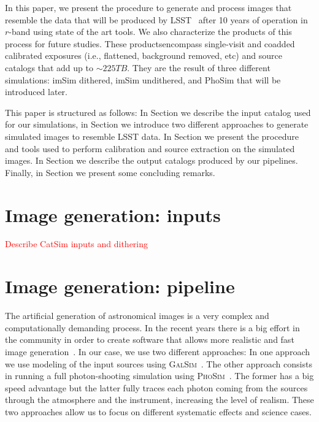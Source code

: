 \documentclass[\docopts]{\docclass}
\begin{document}
In this paper, we present the procedure to generate and process images that resemble the data that will be produced by
LSST~\citep{2008arXiv0805.2366I} after 10 years of operation in $r$-band using state of the art tools. We also characterize
the products of this process for future studies. These productsencompass single-visit and coadded calibrated exposures
(i.e., flattened, background removed, etc) and source catalogs that add up to $\sim 225 TB$. They are the result of three
different simulations: imSim dithered, imSim undithered, and PhoSim that will be introduced later.

This paper is structured as follows: In Section  we describe the input catalog used for our simulations,
in Section  we introduce two different approaches to generate simulated images to
resemble LSST data. In Section  we present the procedure and tools used to perform
calibration and source extraction on the simulated images. In Section  we describe the output catalogs
produced by our pipelines. Finally, in Section  we present some concluding remarks.

\section{Image generation: inputs}
\label{sec:inputs}

\textcolor{red}{Describe CatSim inputs and dithering}

\section{Image generation: pipeline}
\label{sec:image_generation_pipeline}

The artificial generation of astronomical images is a very complex and computationally demanding process. In the recent
years there is a big effort in the community in order to create software that allows more realistic and fast image
generation~\citep{2016MNRAS.457..786S,2016ApJ...817...25B}. In our case, we use two different approaches: In one approach
we use modeling of the input sources using \textsc{GalSim}~\citep{2015A&C....10..121R}. The other approach consists in
running a full photon-shooting simulation using \textsc{PhoSim}~\citep{2015ApJS..218...14P}. The former has a big speed
advantage but the latter fully traces each photon coming from the sources through the atmosphere and the instrument,
 increasing the level of realism. These two approaches allow us to focus on different systematic effects and science cases.
\end{document}
